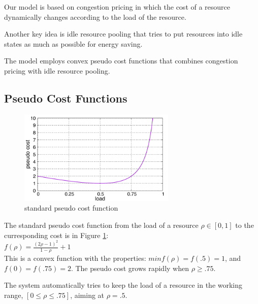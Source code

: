 



Our model is based on congestion pricing in which the cost of a
resource dynamically changes according to the load of the resource.

Another key idea is idle resource pooling that tries to put resources
into idle states as much as possible for energy saving.

The model employs convex pseudo cost functions that combines congestion
pricing with idle resource pooling.

\subsection{Pseudo Cost Functions}

\begin{figure}[thb]
\begin{center}
\includegraphics[width=7.5cm,clip]{costfunc.pdf}
\vspace{-2.0ex}
\caption{standard pseudo cost function}
\label{fig:std_costfunc}
\end{center}
\end{figure}

The standard pseudo cost function from the load of a resource
$\rho \in [0, 1]$ to the curresponding cost is in Figure
\ref{fig:std_costfunc}: \\

\( f(\rho) = \frac{(2\rho - 1)^{2}}{1 - \rho} + 1  \) \\

This is a convex function with the properties:
$min f(\rho) = f(.5) = 1$, and $f(0) = f(.75) = 2$.
The pseudo cost grows rapidly when $\rho \ge .75$.

The system automatically tries to keep the load of a resource in the
working range, $[0 \le \rho \le .75]$, aiming at $\rho = .5$. \\

